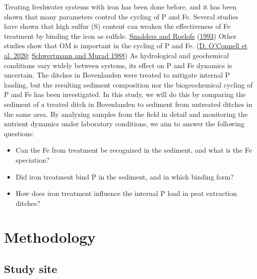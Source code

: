 \documentclass[a4paper,11pt]{article}
\begin{document}
Treating freshwater systems with iron has been done before, and it has been shown that many parameters control the cycling of P and Fe. Several studies have shown that high sulfur (S) content can weaken the effectiveness of Fe treatment by binding the iron as sulfide. \protect\hyperlink{ref-smoldersSulphatemediatedIronLimitation1993}{Smolders and Roelofs} (\protect\hyperlink{ref-smoldersSulphatemediatedIronLimitation1993}{1993}) Other studies show that OM is important in the cycling of P and Fe. (\protect\hyperlink{ref-oconnellChangesSedimentaryPhosphorus2020}{D. O'Connell et al. 2020}; \protect\hyperlink{ref-schwertmannNatureIronOxide1988}{Schwertmann and Murad 1988}) As hydrological and geochemical conditions vary widely between systems, its effect on P and Fe dynamics is uncertain. The ditches in Bovenlanden were treated to mitigate internal P loading, but the resulting sediment composition nor the biogeochemical cycling of P and Fe has been investigated. In this study, we will do this by comparing the sediment of a treated ditch in Bovenlanden to sediment from untreated ditches in the same area.
By analyzing samples from the field in detail and monitoring the nutrient dynamics under laboratory conditions, we aim to answer the following questions:
\begin{itemize}
\item
  Can the Fe from treatment be recognized in the sediment, and what is the Fe speciation?
\item
  Did iron treatment bind P in the sediment, and in which binding form?
\item
  How does iron treatment influence the internal P load in peat extraction ditches?
\end{itemize}
\hypertarget{methodology}{%
\section{Methodology}\label{methodology}}

\hypertarget{study-site}{%
\subsection{Study site}\label{study-site}}
\end{document}
